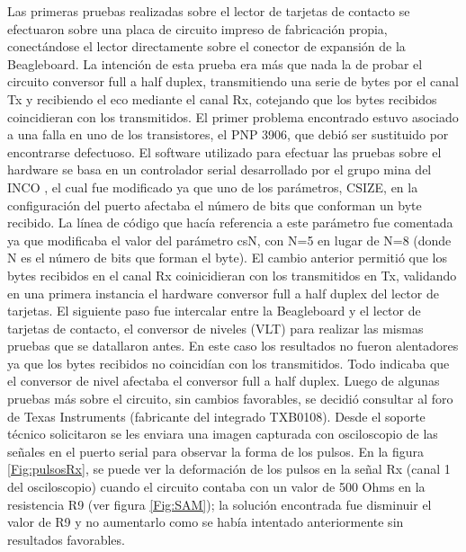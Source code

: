 
Las primeras pruebas realizadas sobre el lector de tarjetas de contacto se efectuaron sobre una
placa de circuito impreso de fabricación propia, conectándose el lector directamente sobre el 
conector de expansión de la Beagleboard. La intención de esta prueba era más que nada la de probar
el circuito conversor full a half duplex, transmitiendo una serie de bytes por el canal Tx y recibiendo
el eco mediante el canal Rx, cotejando que los bytes recibidos coincidieran con los transmitidos. 
El primer problema encontrado estuvo asociado a una falla en uno de los transistores, el PNP 3906, 
que debió ser sustituido por encontrarse defectuoso.
El software utilizado para efectuar las pruebas sobre el hardware se basa en un controlador serial 
desarrollado por el grupo mina del INCO \cite{mina}, el cual fue modificado ya que uno de los parámetros, CSIZE, en la configuración del puerto afectaba el número de bits que conforman un byte recibido. 
La línea de código que hacía referencia a este parámetro fue comentada ya que modificaba el valor del parámetro 
csN, con N=5 en lugar de N=8 (donde N es el número de bits que forman el byte). 
El cambio anterior permitió que los bytes recibidos en el canal Rx coinicidieran con los transmitidos en Tx, 
validando en una primera instancia el hardware conversor full a half duplex del lector de tarjetas.
El siguiente paso fue intercalar entre la Beagleboard y el lector de tarjetas de contacto, el conversor de niveles (VLT) para realizar las mismas pruebas que se datallaron antes. En este caso los resultados no fueron alentadores ya que los bytes recibidos no coincidían con los transmitidos. Todo indicaba que el conversor de nivel afectaba el conversor full a half duplex. Luego de algunas pruebas más sobre el circuito, sin cambios favorables, se decidió consultar al foro de Texas Instruments (fabricante del integrado TXB0108). Desde el soporte técnico solicitaron se les enviara una imagen capturada con osciloscopio de las señales en el puerto serial para observar la forma de los pulsos. En la figura \ref{Fig:pulsosRx}, se puede ver la deformación de los pulsos en la señal Rx (canal 1 del osciloscopio) cuando el circuito contaba con un valor de 500 Ohms en la resistencia R9 (ver figura \ref{Fig:SAM}); la solución encontrada fue disminuir el valor de R9 y no aumentarlo como se había intentado anteriormente sin resultados favorables.

